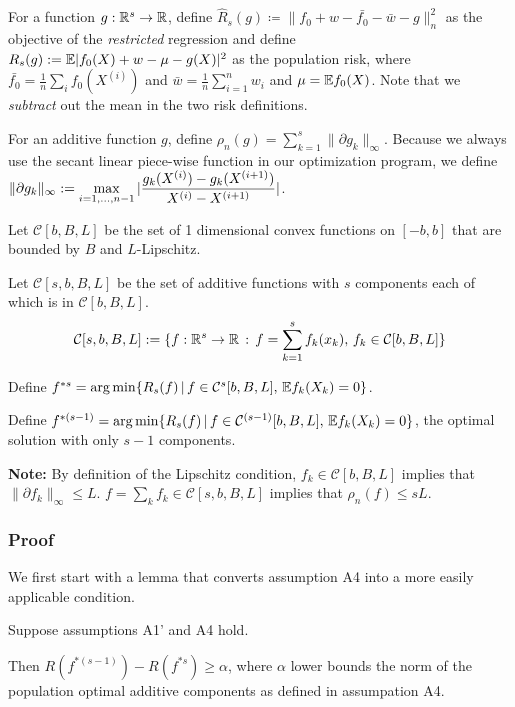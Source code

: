 For a function $g : {\mathbb R}^s \rightarrow {\mathbb R}$, define $\hat{R}_s(g) \coloneqq \| f_0 + w - \bar{f_0} - \bar{w} - g \|_n^2$ as the objective of the \emph{restricted} regression and define $R_s(g) := {\mathbb E} | f_0(X)  + w - \mu - g(X) |^2$ as the population risk, where $\bar{f_0} = \frac{1}{n} \sum_i f_0(X^{(i)})$ and $\bar{w} = \frac{1}{n}\sum_{i=1}^n w_i $ and $\mu = {\mathbb E} f_0(X)$. Note that we \emph{subtract} out the mean in the two risk definitions.

For an additive function $g$, define $\rho_n(g) = \sum_{k=1}^s \| \partial g_k \|_\infty$. Because we always use the secant linear piece-wise function in our optimization program, we define $\displaystyle \| \partial g_k\|_\infty := \max_{i=1,...,n-1} |\frac{ g_k(X^{(i)}) - g_k(X^{(i+1)})}{ X^{(i)} - X^{(i+1)}}|$.

Let $\mathcal{C}[b,B,L]$ be the set of 1 dimensional convex functions on $[-b,b]$ that are bounded by $B$ and $L$-Lipschitz.

Let $\mathcal{C}[s,b,B,L]$ be the set of additive functions with $s$ components each of which is in $\mathcal{C}[b,B,L]$. 
\[
\mathcal{C}[s,b,B,L] := \{ f : {\mathbb R}^s \rightarrow {\mathbb R} \,:\, f = \sum_{k=1}^s f_k(x_k), \, f_k \in \mathcal{C}[b,B,L] \}
\]
 
Define $f^{*s} = \arg\min \{ R_s(f) \,|\, f \in \mathcal{C}^s[b,B,L], \, {\mathbb E} f_k(X_k) = 0\}$.

Define $f^{*(s-1)} = \arg\min \{ R_s(f) \,|\, f \in \mathcal{C}^{(s-1)}[b,B,L], \, {\mathbb E} f_k(X_k) = 0\}$, the optimal solution with only $s-1$ components.

\textbf{Note:} By definition of the Lipschitz condition, $f_k \in \mathcal{C}[b,B,L]$ implies that $\| \partial f_k \|_\infty \leq L$. $f = \sum_k f_k \in \mathcal{C}[s,b,B,L]$ implies that $\rho_n(f) \leq sL$.

\subsubsection{Proof}
\label{sec:false_negative_proof_proof}

We first start with a lemma that converts assumption A4 into a more easily applicable condition.
\begin{lemma}
\label{lem:minus_one_risk_increase}
Suppose assumptions A1' and A4 hold. 

Then $R(f^{*(s-1)}) - R(f^{*s}) \geq \alpha$, where $\alpha$ lower bounds the norm of the population optimal additive components as defined in assumpation A4.
\end{lemma}

